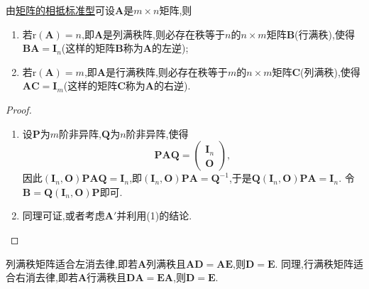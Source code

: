 \documentclass[../../main.tex]{subfiles}%
\begin{document}
\begin{proposition}[行/列满秩矩阵性质]\label{proposition:行/列满秩矩阵性质}
由\hyperref[theorem:相抵标准型]{矩阵的相抵标准型}可设\(\boldsymbol{A}\)是\(m\times n\)矩阵,则
\begin{enumerate}[(1)]
\item 若\(\mathrm{r}(\boldsymbol{A}) = n\),即\(\boldsymbol{A}\)是列满秩阵,则必存在秩等于\(n\)的\(n\times m\)矩阵\(\boldsymbol{B}\)(行满秩),使得\(\boldsymbol{B}\boldsymbol{A}=\boldsymbol{I}_n\)(这样的矩阵\(\boldsymbol{B}\)称为\(\boldsymbol{A}\)的左逆);
\item 若\(\mathrm{r}(\boldsymbol{A}) = m\),即\(\boldsymbol{A}\)是行满秩阵,则必存在秩等于\(m\)的\(n\times m\)矩阵\(\boldsymbol{C}\)(列满秩),使得\(\boldsymbol{A}\boldsymbol{C}=\boldsymbol{I}_m\)(这样的矩阵\(\boldsymbol{C}\)称为\(\boldsymbol{A}\)的右逆).
\end{enumerate}
\end{proposition}
\begin{proof}
\begin{enumerate}[(1)]
\item 设\(\boldsymbol{P}\)为\(m\)阶非异阵,\(\boldsymbol{Q}\)为\(n\)阶非异阵,使得
\[
\boldsymbol{P}\boldsymbol{A}\boldsymbol{Q}=\begin{pmatrix}
\boldsymbol{I}_n\\
\boldsymbol{O}
\end{pmatrix},
\]
因此\((\boldsymbol{I}_n,\boldsymbol{O})\boldsymbol{P}\boldsymbol{A}\boldsymbol{Q}=\boldsymbol{I}_n\),即\((\boldsymbol{I}_n,\boldsymbol{O})\boldsymbol{P}\boldsymbol{A}=\boldsymbol{Q}^{-1}\),于是\(\boldsymbol{Q}(\boldsymbol{I}_n,\boldsymbol{O})\boldsymbol{P}\boldsymbol{A}=\boldsymbol{I}_n\). 令\(\boldsymbol{B}=\boldsymbol{Q}(\boldsymbol{I}_n,\boldsymbol{O})\boldsymbol{P}\)即可.

\item 同理可证,或者考虑\(\boldsymbol{A}'\)并利用(1)的结论.
\end{enumerate}

\end{proof}

\begin{corollary}\label{corollary:列满秩矩阵适合左消去律/行满秩矩阵适合右消去律}
列满秩矩阵适合左消去律,即若\(\boldsymbol{A}\)列满秩且\(\boldsymbol{A}\boldsymbol{D}=\boldsymbol{A}\boldsymbol{E}\),则\(\boldsymbol{D}=\boldsymbol{E}\). 同理,行满秩矩阵适合右消去律,即若\(\boldsymbol{A}\)行满秩且\(\boldsymbol{D}\boldsymbol{A}=\boldsymbol{E}\boldsymbol{A}\),则\(\boldsymbol{D}=\boldsymbol{E}\).
\end{corollary}
\end{document}
